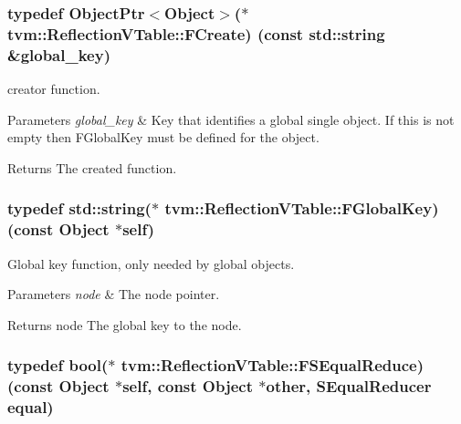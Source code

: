 \subsubsection[{\texorpdfstring{F\+Create}{FCreate}}]{\setlength{\rightskip}{0pt plus 5cm}typedef Object\+Ptr$<$Object$>$($\ast$ tvm\+::\+Reflection\+V\+Table\+::\+F\+Create) (const std\+::string \&global\+\_\+key)}\hypertarget{classtvm_1_1ReflectionVTable_adf61fde4dfac8d1cb59159db6722b335}{}\label{classtvm_1_1ReflectionVTable_adf61fde4dfac8d1cb59159db6722b335}


creator function. 


\begin{DoxyParams}{Parameters}
{\em global\+\_\+key} & Key that identifies a global single object. If this is not empty then F\+Global\+Key must be defined for the object. \\
\hline
\end{DoxyParams}
\begin{DoxyReturn}{Returns}
The created function. 
\end{DoxyReturn}
\subsubsection[{\texorpdfstring{F\+Global\+Key}{FGlobalKey}}]{\setlength{\rightskip}{0pt plus 5cm}typedef std\+::string($\ast$ tvm\+::\+Reflection\+V\+Table\+::\+F\+Global\+Key) (const Object $\ast$self)}\hypertarget{classtvm_1_1ReflectionVTable_abe09d73c5ea2c51f5cfa30471b8f89ef}{}\label{classtvm_1_1ReflectionVTable_abe09d73c5ea2c51f5cfa30471b8f89ef}


Global key function, only needed by global objects. 


\begin{DoxyParams}{Parameters}
{\em node} & The node pointer. \\
\hline
\end{DoxyParams}
\begin{DoxyReturn}{Returns}
node The global key to the node. 
\end{DoxyReturn}
\subsubsection[{\texorpdfstring{F\+S\+Equal\+Reduce}{FSEqualReduce}}]{\setlength{\rightskip}{0pt plus 5cm}typedef bool($\ast$ tvm\+::\+Reflection\+V\+Table\+::\+F\+S\+Equal\+Reduce) (const Object $\ast$self, const Object $\ast$other, {\bf S\+Equal\+Reducer} equal)}\hypertarget{classtvm_1_1ReflectionVTable_a656516c928f74d7b6345abd8c8f04358}{}\label{classtvm_1_1ReflectionVTable_a656516c928f74d7b6345abd8c8f04358}


